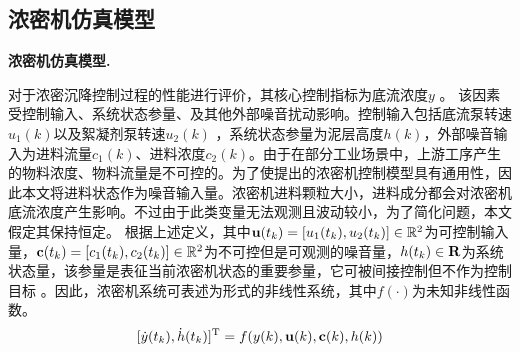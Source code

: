 \subsection{浓密机仿真模型}
{\bf 浓密机仿真模型.}

对于浓密沉降控制过程的性能进行评价，其核心控制指标为底流浓度$y$ 。
该因素受控制输入、系统状态参量、及其他外部噪音扰动影响。控制输入包括底流泵转速$u_1(k)$以及絮凝剂泵转速$u_2(k)$
，系统状态参量为泥层高度$h(k)$，外部噪音输入为进料流量$c_1(k)$、进料浓度$c_2(k)$。由于在部分工业场景中，上游工序产生的物料浓度、物料流量是不可控的。为了使提出的浓密机控制模型具有通用性，因此本文将进料状态作为噪音输入量。浓密机进料颗粒大小，进料成分都会对浓密机底流浓度产生影响。不过由于此类变量无法观测且波动较小，为了简化问题，本文假定其保持恒定。
根据上述定义，其中$\mathbf u(t_k)=[u_1(t_k),u_2(t_k)] \in
\mathbb{R}^2$为可控制输入量，$\mathbf c(t_k)=[c_1(t_k),c_2(t_k)] \in
\mathbb{R}^2$为不可控但是可观测的噪音量，$h(t_k) \in \bf
R$为系统状态量，该参量是表征当前浓密机状态的重要参量，它可被间接控制但不作为控制目标
。因此，浓密机系统可表述为形式的非线性系统，其中$f
( \cdot )$为未知非线性函数。
\begin{equation}\label{equ:system_dynamic}
    [\dot y ( t_{k} ), \dot h(t_{k})]^{\rm T} = f (y(k), \mathbf u ( k ) ,\mathbf c ( k ) , h(k))
\end{equation}

